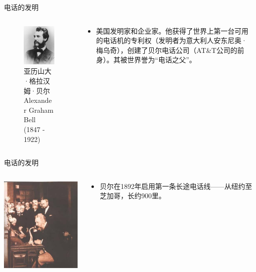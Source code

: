 \documentclass{ctexbeamer}
\begin{document}
\begin{frame}{电话的发明}
  \begin{columns}
    \begin{column}{0.4\linewidth}
    \begin{figure}
      \includegraphics[width=3.5cm]{Bell.jpg}
      \caption{亚历山大·格拉汉姆·贝尔Alexander Graham Bell (1847 - 1922)}
    \end{figure}
    \end{column}
    \begin{column}{0.6\linewidth}
      \begin{itemize}
        \item 美国发明家和企业家。他获得了世界上第一台可用的电话机的专利权（发明者为意大利人安东尼奥·梅乌奇），创建了贝尔电话公司（AT\&T公司的前身）。其被世界誉为“电话之父”。
      \end{itemize}
    \end{column}
  \end{columns}
\end{frame}

\begin{frame}{电话的发明}
  \begin{columns}
    \begin{column}{0.5\linewidth}
      \includegraphics[width=5.5cm]{Bell2}
    \end{column}
    \begin{column}{0.5\linewidth}
      \begin{itemize}
        \item 贝尔在1892年启用第一条长途电话线——从纽约至芝加哥，长约900里。
      \end{itemize}
    \end{column}
  \end{columns}
\end{frame}
\end{document}
